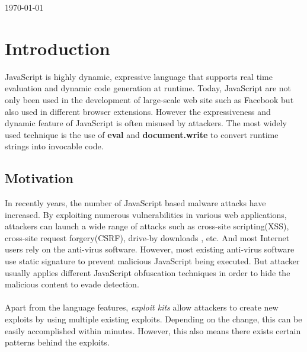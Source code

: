 \documentclass[11pt]{article}
\begin{document}
\begin{titlepage}

{\large \today}\\[0.5cm] %


\vfill %

\end{titlepage}

\newpage
\tableofcontents
\newpage

\section{Introduction}
JavaScript is highly dynamic, expressive language that supports real time evaluation and dynamic code generation at runtime. Today, JavaScript are not only been used in the development of large-scale web site such as Facebook but also used in different browser extensions. However the expressiveness and dynamic feature of JavaScript is often misused by attackers. The most widely used technique is the use of \textbf{eval} and \textbf{document.write} to convert runtime strings into invocable code. 
\subsection{Motivation}
In recently years, the number of JavaScript based malware attacks have increased. By exploiting numerous vulnerabilities in various web applications, attackers can launch a wide range of at­tacks such as cross-site scripting(XSS)\cite{XSS}, cross-site request forgery(CSRF)\cite{CSRF}, drive-by downloads \cite{Drive-by Downloads}, etc. And most Internet users rely on the anti-virus software. However,  most existing anti-virus software use static signature to prevent malicious JavaScript being executed. But attacker usually applies different JavaScript obfuscation techniques in order to hide the malicious content to evade detection. \\ \\
Apart from the language features, \textit{exploit kits}\cite{EK} allow attackers to create new exploits by using multiple existing exploits. Depending on the change, this can be easily accomplished within minutes. However, this also means there exists certain patterns behind the exploits. 
\end{document}
